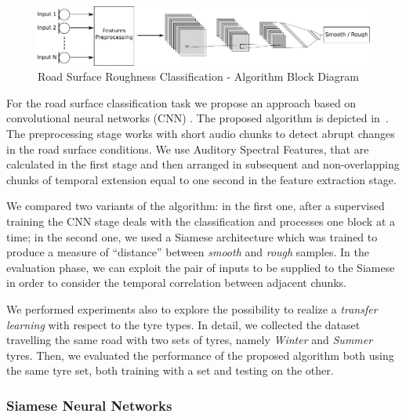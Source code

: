 \begin{figure}[h]
	\centering
	\includegraphics[width=1.0\linewidth]{img/flowchart_orizzontale}
	\caption[Road Surface Roughness Classification]{Road Surface Roughness Classification - Algorithm Block Diagram}
	\label{fig:algoritmo-orizzontale}
\end{figure}


For the road surface classification task we propose an approach based on convolutional neural networks (CNN) \cite{lecun1995convolutional}. The proposed algorithm is depicted in~. The preprocessing stage works with short audio chunks to detect abrupt changes in the road surface conditions. We use Auditory Spectral Features, that are calculated in the first stage and then arranged in subsequent and non-overlapping chunks of temporal extension equal to one second in the feature extraction stage. 

We compared two variants of the algorithm: in the first one, after a supervised training the CNN stage deals with the classification and processes one block at a time; in the second one, we used a Siamese architecture which was trained to produce a measure of ``distance'' between \textit{smooth} and \textit{rough} samples. In the evaluation phase, we can exploit the pair of inputs to be supplied to the Siamese in order to consider the temporal correlation between adjacent chunks.

We performed experiments also to explore the possibility to realize a \textit{transfer learning} with respect to the tyre types. In detail, we collected the dataset travelling the same road with two sets of tyres, namely \textit{Winter} and \textit{Summer} tyres. Then, we evaluated the performance of the proposed algorithm both using the same tyre set, both training with a set and testing on the other.

\subsubsection{Siamese Neural Networks}

